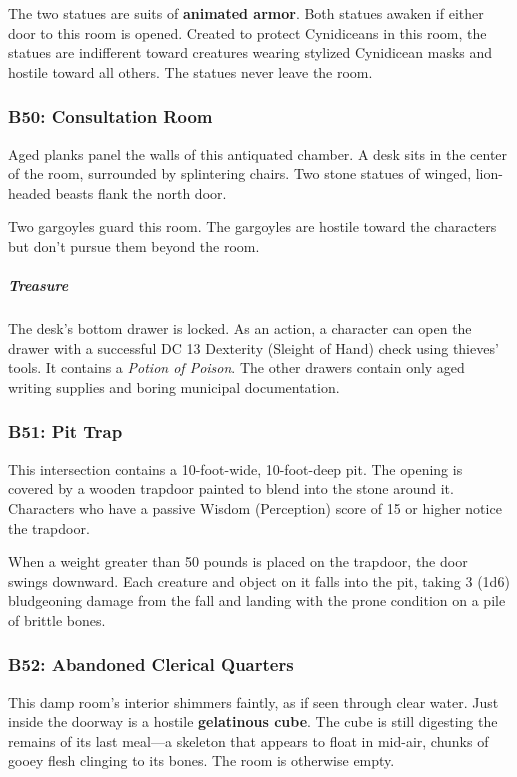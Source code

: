 \documentclass[10pt,a4paper,twoside,bg=print,twocolumn,openany,nodeprecatedcode]{dndbook}
\begin{document}
The two statues are suits of \textbf{animated armor}. Both statues awaken if either door to this room is opened. Created to protect Cynidiceans in this room, the statues are indifferent toward creatures wearing stylized Cynidicean masks and hostile toward all others. The statues never leave the room.

\subsubsection{B50: Consultation Room}
\begin{DndReadAloud}{}
Aged planks panel the walls of this antiquated chamber. A desk sits in the center of the room, surrounded by splintering chairs. Two stone statues of winged, lion-headed beasts flank the north door.

\end{DndReadAloud}

Two gargoyles guard this room. The gargoyles are hostile toward the characters but don't pursue them beyond the room.

\subparagraph{Treasure}
The desk's bottom drawer is locked. As an action, a character can open the drawer with a successful DC 13 Dexterity (Sleight of Hand) check using thieves' tools. It contains a \textit{Potion of Poison}. The other drawers contain only aged writing supplies and boring municipal documentation.

\subsubsection{B51: Pit Trap}
This intersection contains a 10-foot-wide, 10-foot-deep pit. The opening is covered by a wooden trapdoor painted to blend into the stone around it. Characters who have a passive Wisdom (Perception) score of 15 or higher notice the trapdoor.

When a weight greater than 50 pounds is placed on the trapdoor, the door swings downward. Each creature and object on it falls into the pit, taking 3 (1d6) bludgeoning damage from the fall and landing with the prone condition on a pile of brittle bones.

\subsubsection{B52: Abandoned Clerical Quarters}
This damp room's interior shimmers faintly, as if seen through clear water. Just inside the doorway is a hostile \textbf{gelatinous cube}. The cube is still digesting the remains of its last meal—a skeleton that appears to float in mid-air, chunks of gooey flesh clinging to its bones. The room is otherwise empty.
\end{document}
